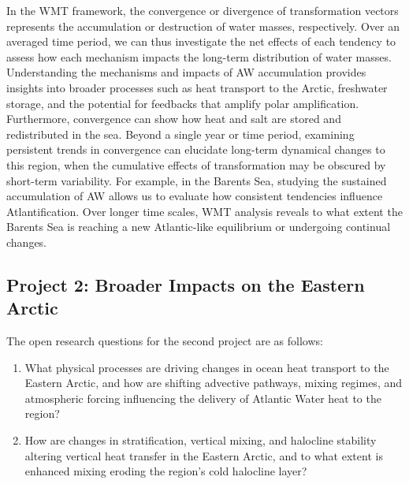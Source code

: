 \documentclass[draft]{agujournal2019}
\begin{document}
In the WMT framework, the convergence or divergence of transformation vectors represents the accumulation or destruction of water masses, respectively. Over an averaged time period, we can thus investigate the net effects of each tendency to assess how each mechanism impacts the long-term distribution of water masses. Understanding the mechanisms and impacts of AW accumulation provides insights into broader processes such as heat transport to the Arctic, freshwater storage, and the potential for feedbacks that amplify polar amplification.  Furthermore, convergence can show how heat and salt are stored and redistributed in the sea. Beyond a single year or time period, examining persistent trends in convergence can elucidate long-term dynamical changes to this region, when the cumulative effects of transformation may be obscured by short-term variability. For example, in the Barents Sea, studying the sustained accumulation of AW allows us to evaluate how consistent tendencies influence Atlantification. Over longer time scales, WMT analysis reveals to what extent the Barents Sea is reaching a new Atlantic-like equilibrium or undergoing continual changes.

\subsection{Project 2: Broader Impacts on the Eastern Arctic}

The open research questions for the second project are as follows:

\begin{enumerate}
    \item What physical processes are driving changes in ocean heat transport to the Eastern Arctic, and how are shifting advective pathways, mixing regimes, and atmospheric forcing influencing the delivery of Atlantic Water heat to the region?
    \item How are changes in stratification, vertical mixing, and halocline stability altering vertical heat transfer in the Eastern Arctic, and to what extent is enhanced mixing eroding the region’s cold halocline layer?
\end{enumerate}
\end{document}

